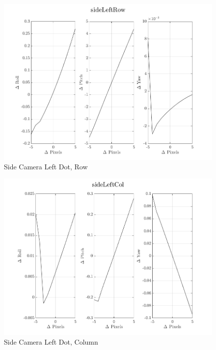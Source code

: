\documentclass[12pt]{article}
\begin{document}
\begin{multicols}{2}

\begin{figure}[H]
	\includegraphics[width=0.9\columnwidth]{sideLeftRow.png}
	\caption{Side Camera Left Dot, Row\label{fig:sideLeftRow}}
\end{figure}

\begin{figure}[H]
	\includegraphics[width=0.9\columnwidth]{sideLeftCol.png}
	\caption{Side Camera Left Dot, Column\label{fig:sideLeftCol}}
\end{figure}


\end{multicols}
\end{document}
